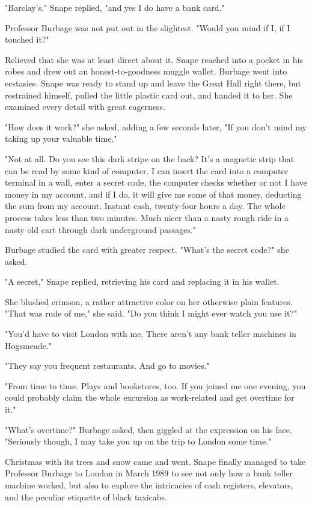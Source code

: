 "Barclay's," Snape replied, "and yes I do have a bank card."

Professor Burbage was not put out in the slightest. "Would you mind if I, if I touched it?"

Relieved that she was at least direct about it, Snape reached into a pocket in his robes and drew out an honest-to-goodness muggle wallet. Burbage went into ecstasies. Snape was ready to stand up and leave the Great Hall right there, but restrained himself, pulled the little plastic card out, and handed it to her. She examined every detail with great eagerness.

"How does it work?" she asked, adding a few seconds later, "If you don't mind my taking up your valuable time."

"Not at all. Do you see this dark stripe on the back? It's a magnetic strip that can be read by some kind of computer. I can insert the card into a computer terminal in a wall, enter a secret code, the computer checks whether or not I have money in my account, and if I do, it will give me some of that money, deducting the sum from my account. Instant cash, twenty-four hours a day. The whole process takes less than two minutes. Much nicer than a nasty rough ride in a nasty old cart through dark underground passages."

Burbage studied the card with greater respect. "What's the secret code?" she asked.

"A secret," Snape replied, retrieving his card and replacing it in his wallet.

She blushed crimson, a rather attractive color on her otherwise plain features. "That was rude of me," she said. "Do you think I might ever watch you use it?"

"You'd have to visit London with me. There aren't any bank teller machines in Hogsmeade."

"They say you{\el} frequent restaurants. And go to{\el} movies."

"From time to time. Plays and bookstores, too. If you joined me one evening, you could probably claim the whole excursion as work-related and get overtime for it."

"What's overtime?" Burbage asked, then giggled at the expression on his face. "Seriously though, I may take you up on the trip to London some time."

Christmas with its trees and snow came and went. Snape finally managed to take Professor Burbage to London in March 1989 to see not only how a bank teller machine worked, but also to explore the intricacies of cash registers, elevators, and the peculiar etiquette of black taxicabs.

